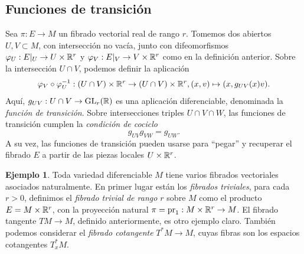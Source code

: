 \documentclass[11pt,a4paper]{amsbook}
\theoremstyle{remark} \newtheorem{rmk}[subsection]{Observación}
\theoremstyle{definition} \newtheorem{defn}[subsection]{Definición}
\theoremstyle{definition} \newtheorem{ex}[subsection]{Ejemplo}
\theoremstyle{definition} \newtheorem{ej}[subsection]{Ejercicio}
\begin{document}
\subsection{Funciones de transición} Sea $\pi:E\rightarrow M$ un fibrado vectorial real de rango $r$. Tomemos dos abiertos $U,V \subset M$, con intersección no vacía, junto con difeomorfismos $\varphi_U:E|_U\rightarrow U\times \mathbb R^r$ y $\varphi_V:E|_V\rightarrow V\times \mathbb R^r$ como en la definición anterior. Sobre la intersección $U\cap V$, podemos definir la aplicación
\begin{equation*}
\varphi_V \circ \varphi_U^{-1}: (U\cap V) \times \mathbb R^r \rightarrow (U\cap V) \times \mathbb R^r, (x,v) \mapsto (x, g_{UV}(x)v).
\end{equation*}
Aquí, $g_{UV}:U\cap V \rightarrow \operatorname{GL}_r(\mathbb R)$ es una aplicación diferenciable, denominada la \emph{función de transición}. Sobre intersecciones triples $U\cap V \cap W$, las funciones de transición cumplen la \emph{condición de cociclo}
\begin{equation*}
g_{UV} g_{VW} = g_{UW}.
\end{equation*}
A su vez, las funciones de transición pueden usarse para ``pegar'' y recuperar el fibrado $E$ a partir de las piezas locales $U\times \mathbb R^r$.

\begin{ex}
  Toda variedad diferenciable $M$ tiene varios fibrados vectoriales asociados naturalmente. En primer lugar están los \textit{fibrados triviales}, para cada $r>0$, definimos el \emph{fibrado trivial de rango $r$} sobre $M$ como el producto $E=M\times \mathbb R^r$, con la proyección natural $\pi=\mathrm{pr}_1:M\times \mathbb R^r\rightarrow M$. El fibrado tangente $TM\rightarrow M$, definido anteriormente, es otro ejemplo claro. También podemos considerar el \emph{fibrado cotangente} $T^*M\rightarrow M$, cuyas fibras son los espacios cotangentes $T^*_xM$.
\end{ex}
\end{document}
